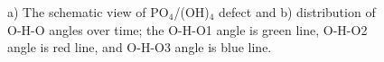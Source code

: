 \begin{figure}[h!]
\begin{minipage}[h]{0.3\linewidth}
\end{minipage}
\hfill
\begin{minipage}[h]{0.7\linewidth}
\end{minipage}
\caption{a) The schematic view of PO$_4$/(OH)$_4$ defect and b) distribution of O-H-O angles over time; the O-H-O1 angle is green line, O-H-O2 angle is red line, and O-H-O3 angle is blue line.}
\label{ris:OHO}
\end{figure}

